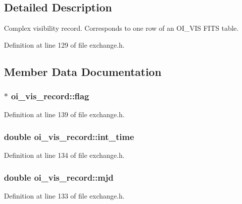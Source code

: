 \subsection{Detailed Description}
Complex visibility record. Corresponds to one row of an OI\_\-VIS FITS table. 

Definition at line 129 of file exchange.h.



\subsection{Member Data Documentation}
\hypertarget{structoi__vis__record_aaf94f160dc061690b41a0d2c6083d9d7}{
\subsubsection[{flag}]{$\ast$ {\bf oi\_\-vis\_\-record::flag}}}
\label{structoi__vis__record_aaf94f160dc061690b41a0d2c6083d9d7}


Definition at line 139 of file exchange.h.

\hypertarget{structoi__vis__record_aaa8814c38efe3c128a0bd6dc19783c2e}{
\subsubsection[{int\_\-time}]{\setlength{\rightskip}{0pt plus 5cm}double {\bf oi\_\-vis\_\-record::int\_\-time}}}
\label{structoi__vis__record_aaa8814c38efe3c128a0bd6dc19783c2e}


Definition at line 134 of file exchange.h.

\hypertarget{structoi__vis__record_abd5ba1716f2f44e792cd05a0b6cdf42c}{
\subsubsection[{mjd}]{\setlength{\rightskip}{0pt plus 5cm}double {\bf oi\_\-vis\_\-record::mjd}}}
\label{structoi__vis__record_abd5ba1716f2f44e792cd05a0b6cdf42c}


Definition at line 133 of file exchange.h.

